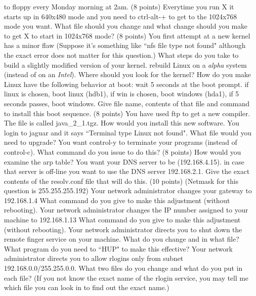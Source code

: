 to floppy every Monday morning at 2am.
\vskip 1.5in
\ques
(8 points)
Everytime you run X it starts up in 640x480 mode and you need to
{\ltt{}ctrl-alt-+} to get to the 1024x768 mode you want.
What file should you change and what change should you make
to get X to start in 1024x768 mode?
\vskip 1.5in
\ques
(8 points)
You first attempt at a new kernel has a minor flaw
(Suppose it's something like ``nfs file type not found" although the exact
error does not matter for this question.)
What steps do you take to build a slightly modified version of your kernel.
rebuild Linux on a {\it alpha} system (instead of on an {\it Intel}).
Where should you look for the kernel?
\vskip 1.4in
How do you make Linux have the following behavior at boot:
wait 5 seconds at the boot prompt.
if linux is chosen, boot linux ({\ltt{}hdb1}),
if win is chosen, boot windows ({\ltt{}hda1}),
if 5 seconds passes, boot windows.
Give file name, contents of that file and command to install
this boot sequence.
\vfill\eject
\ques
(8 points)
You have used ftp to get a new compiler.
The file is called {\ltt{}java_2_1.tgz}.
How would you install this new software.
\vskip 0.8in
You login to jaguar and it says ``Terminal type Linux not found".
What file would you need to upgrade?
\vskip 0.4in
You want control-y to terminate your programs (instead of control-c).
What command do you issue to do this?
\vskip 0.4in
\ques
(8 points)
How would you examine the arp table?
\vskip 0.5in
You want your DNS server to be ({\ltt{}192.168.4.15}).
in case that server is off-line you want to use the
DNS server {\ltt{}192.168.2.1}.
Give the exact contents of the {\ltt{}resolv.conf} file that will do this.
\vskip 1.2in
\ques
(10 points)
(Netmask for this question is {\ltt{}255.255.255.192}) 
\hfill
\break
Your network administrator changes your gateway to {\ltt{}192.168.1.4}
What command do you give to make this adjustment (without rebooting).
\vskip 0.5in
Your network administrator changes the IP number assigned to your
machine to {\ltt{}192.168.1.13}
What command do you give to make this adjustment (without rebooting).
\vskip 0.5in
Your network administrator directs you to shut down the remote finger
service on your machine.
What do you change and in what file?
What program do you need to ``HUP" to make this effective?
\vskip 0.5in
Your network administrator directs you to allow rlogins only
from subnet {\ltt{}192.168.0.0/255.255.0.0}.
What two files do you change and what do you put in each file?
(If you not know the exact name of the rlogin service,
you may tell me which file you can look in to find out the exact name.)
\bye
